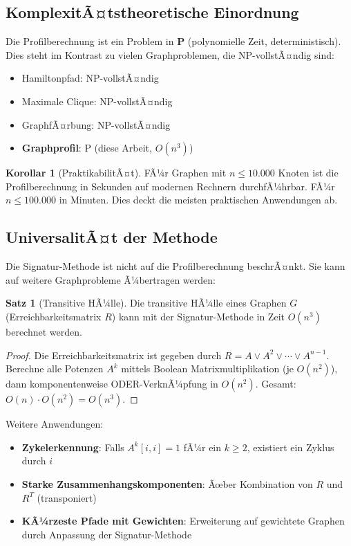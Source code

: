 ﻿\documentclass[a4paper,12pt]{article}
\theoremstyle{definition}
\newtheorem{satz}{Satz}
\newtheorem{korollar}{Korollar}
\begin{document}
	\subsection{KomplexitÃ¤tstheoretische Einordnung}
	
	Die Profilberechnung ist ein Problem in \textbf{P} (polynomielle Zeit, deterministisch). Dies steht im Kontrast zu vielen Graphproblemen, die NP-vollstÃ¤ndig sind:
	
	\begin{itemize}
		\item[-] Hamiltonpfad: NP-vollstÃ¤ndig
		\item[-] Maximale Clique: NP-vollstÃ¤ndig
		\item[-] GraphfÃ¤rbung: NP-vollstÃ¤ndig
		\item[-] \textbf{Graphprofil}: P (diese Arbeit, $O(n^3)$)
	\end{itemize}
	
	\begin{korollar}[PraktikabilitÃ¤t]
		FÃ¼r Graphen mit $n \leq 10.000$ Knoten ist die Profilberechnung in Sekunden auf modernen Rechnern durchfÃ¼hrbar. FÃ¼r $n \leq 100.000$ in Minuten. Dies deckt die meisten praktischen Anwendungen ab.
	\end{korollar}
	
	\subsection{UniversalitÃ¤t der Methode}
	
	Die Signatur-Methode ist nicht auf die Profilberechnung beschrÃ¤nkt. Sie kann auf weitere Graphprobleme Ã¼bertragen werden:
	
	\begin{satz}[Transitive HÃ¼lle]
		Die transitive HÃ¼lle eines Graphen $G$ (Erreichbarkeitsmatrix $R$) kann mit der Signatur-Methode in Zeit $O(n^3)$ berechnet werden.
	\end{satz}
	
	\begin{proof}
		Die Erreichbarkeitsmatrix ist gegeben durch $R = A \vee A^2 \vee \cdots \vee A^{n-1}$. Berechne alle Potenzen $A^k$ mittels Boolean Matrixmultiplikation (je $O(n^2)$), dann komponentenweise ODER-VerknÃ¼pfung in $O(n^2)$. Gesamt: $O(n) \cdot O(n^2) = O(n^3)$.
	\end{proof}
	
	Weitere Anwendungen:
	\begin{itemize}
		\item[-] \textbf{Zykelerkennung}: Falls $A^k[i,i] = 1$ fÃ¼r ein $k \geq 2$, existiert ein Zyklus durch $i$
		\item[-] \textbf{Starke Zusammenhangskomponenten}: Ãœber Kombination von $R$ und $R^T$ (transponiert)
		\item[-] \textbf{KÃ¼rzeste Pfade mit Gewichten}: Erweiterung auf gewichtete Graphen durch Anpassung der Signatur-Methode
	\end{itemize}
	
\end{document}
